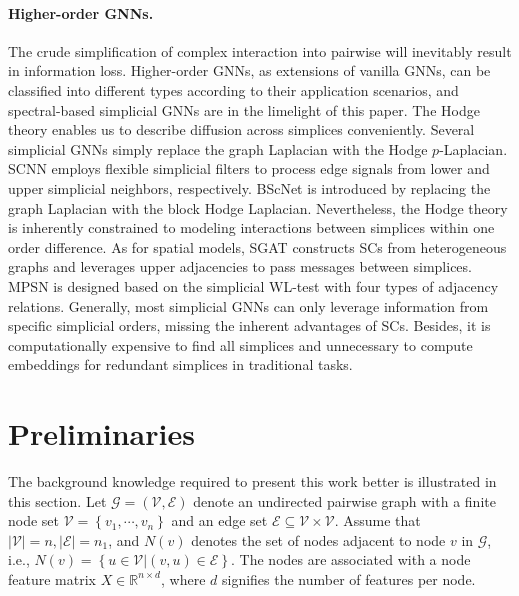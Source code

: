 \documentclass[letterpaper]{article} \usepackage{aaai24}
\theoremstyle{plain}
\theoremstyle{definition}
\theoremstyle{remark}
\begin{document}
\paragraph{Higher-order GNNs.} 

The crude simplification of complex interaction into pairwise will inevitably result in information loss. 
Higher-order GNNs, as extensions of vanilla GNNs, can be classified into different types according to their application scenarios, and spectral-based simplicial GNNs are in the limelight of this paper.
The Hodge theory \cite{Hodge_Hatcher} enables us to describe diffusion across simplices conveniently.
Several simplicial GNNs \cite{SNN2020, SCoNe21Roddenberry} simply replace the graph Laplacian with the Hodge $p$-Laplacian. 
SCNN \cite{SCNN2022} employs flexible simplicial filters to process edge signals from lower and upper simplicial neighbors, respectively. 
BScNet \cite{BScNets} is introduced by replacing the graph Laplacian with the block Hodge Laplacian. Nevertheless, the Hodge theory is inherently constrained to modeling interactions between simplices within one order difference.
As for spatial models, SGAT \cite{SGAT} constructs SCs from heterogeneous graphs and leverages upper adjacencies to pass messages between simplices.
MPSN \cite{SWL2021} is designed based on the simplicial WL-test with four types of adjacency relations. 
Generally, most simplicial GNNs can only leverage information from specific simplicial orders, missing the inherent advantages of SCs.
Besides, it is computationally expensive to find all simplices \cite{maxClique1999} and unnecessary to compute embeddings for redundant simplices in traditional tasks.

\section{Preliminaries}






The background knowledge required to present this work better is illustrated in this section.
Let $\mathcal{G}=\left(\mathcal{V},\mathcal{E}\right)$ denote an undirected pairwise graph with a finite node set $\mathcal{V}=\left\{v_1,\cdots,v_n\right\}$ and an edge set $\mathcal{E} \subseteq \mathcal{V}\times\mathcal{V}$. Assume that $|\mathcal{V}|=n, |\mathcal{E}|=n_1$, and $N(v)$ denotes the set of nodes adjacent to node $v$ in $\mathcal{G}$, i.e., $N(v)=\left\{u \in \mathcal{V} | (v,u)\in \mathcal{E}\right\}$.
The nodes are associated with a node feature matrix $X \in \mathbb{R}^{n\times d}$, where $d$ signifies the number of features per node.
\end{document}
